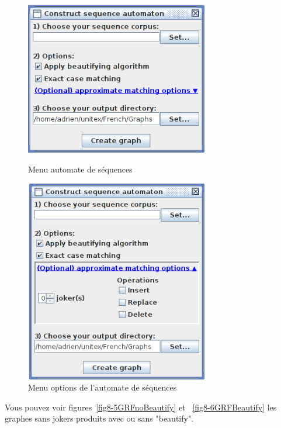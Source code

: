 \begin{figure}[h!]
	\begin{minipage}[h!]{0.5\linewidth}	
		\centering
			\includegraphics[width=8cm]{resources/img/fig8-4Menu1.png}
			\caption{Menu automate de séquences\label{fig8-4Menu1}}
	\end{minipage}	
	\hspace{0.3cm}
	\begin{minipage}[h!]{0.5\linewidth}	
		\centering
			\includegraphics[width=8cm]{resources/img/fig8-4Menu2.png}
			\caption{Menu options de l'automate de séquences\label{fig8-4Menu2}}
	\end{minipage}
\end{figure}

\bigskip
\noindent Vous pouvez voir figures~\ref{fig8-5GRFnoBeautify} et ~\ref{fig8-6GRFBeautify} les graphes
sans jokers produits avec ou sans "beautify".


